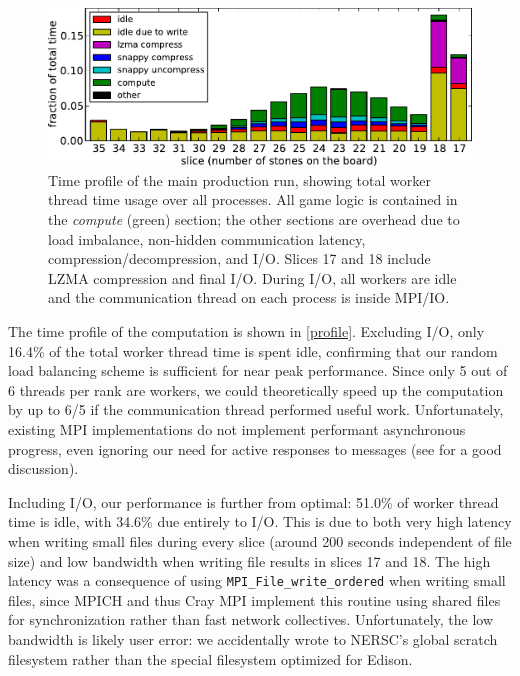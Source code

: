 \documentclass[conference]{IEEEtran}
\begin{document}
\begin{figure}
\begin{center}
\includegraphics[width=\columnwidth]{profile.pdf}
\end{center}
\vspace{-.1in}
\cprotect\caption{Time profile of the main production run, showing total worker thread time usage over
all processes.  All game logic is contained in the \emph{compute} (green) section; the other sections are
overhead due to load imbalance, non-hidden communication latency, compression/decompression, and I/O.
Slices 17 and 18 include LZMA compression and final I/O.  During I/O, all workers are idle and the communication
thread on each process is inside MPI/IO.}
\label{profile}
\vspace{-.12in}
\end{figure}

The time profile of the computation is shown in \autoref{profile}.  Excluding I/O, only 16.4\% of the
total worker thread time is spent idle,
confirming that our random load balancing scheme is sufficient for near peak performance.  Since only 5
out of 6 threads per rank are workers, we could theoretically speed up the computation by up to 6/5 if
the communication thread performed useful work.  Unfortunately, existing MPI implementations do not
implement performant asynchronous progress, even ignoring our need for active responses to messages
(see \cite{squyres2012progress} for a good discussion).

Including I/O, our performance is further from optimal: 51.0\% of worker thread time is
idle, with 34.6\% due entirely to I/O.  This is due to both very high latency when
writing small files during every slice (around 200 seconds independent of file size) and low bandwidth
when writing file results in slices 17 and 18.  The high latency was a consequence of
using \verb+MPI_File_write_ordered+ when writing small files, since MPICH and thus Cray MPI
implement this routine using shared files for synchronization rather than fast network collectives.
Unfortunately, the low bandwidth is likely user error: we accidentally wrote to NERSC's
global scratch filesystem rather than the special filesystem optimized for Edison.
\end{document}
